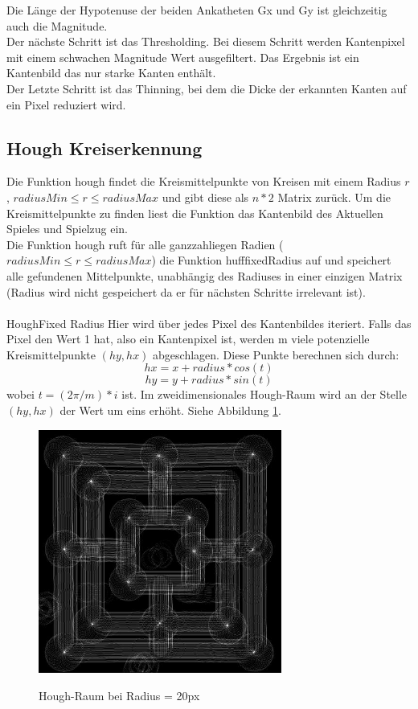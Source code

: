 \documentclass[paper=A4, deutsch]{scrartcl}
\begin{document}
Die Länge der Hypotenuse der beiden Ankatheten Gx und Gy ist gleichzeitig auch die Magnitude.\\
Der nächste Schritt ist das Thresholding. Bei diesem Schritt werden Kantenpixel mit einem schwachen Magnitude Wert ausgefiltert. Das Ergebnis ist ein Kantenbild das nur starke Kanten enthält.\\
Der Letzte Schritt ist das Thinning, bei dem die Dicke der erkannten Kanten auf ein Pixel reduziert wird.\\

\subsection{Hough Kreiserkennung}
Die Funktion hough findet die Kreismittelpunkte von Kreisen mit einem Radius \(r\), \(radiusMin \leq r \leq radiusMax \)  und gibt diese als \(n * 2\) Matrix zurück. 
Um die Kreismittelpunkte zu finden liest die Funktion das Kantenbild des Aktuellen Spieles und Spielzug ein. \\
Die Funktion hough ruft für alle ganzzahliegen Radien (\(radiusMin \leq r \leq radiusMax\)) die Funktion hufffixedRadius auf und speichert alle gefundenen Mittelpunkte, unabhängig des Radiuses in einer einzigen Matrix (Radius wird nicht gespeichert da er für nächsten Schritte irrelevant ist).\\
\\

HoughFixed Radius
Hier wird über jedes Pixel des Kantenbildes iteriert. Falls das Pixel den Wert 1 hat, also ein Kantenpixel ist, werden m  viele potenzielle Kreismittelpunkte \((hy, hx)\)  abgeschlagen. Diese Punkte berechnen sich durch:  
\begin{equation}
hx = x + radius * cos(t)
\end{equation}
\begin{equation}
hy = y + radius *  sin(t)
\end{equation}
wobei \(t = (2\pi/m)*i\) ist. 
Im zweidimensionales Hough-Raum wird an der Stelle \((hy, hx)\) der Wert um eins erhöht. Siehe Abbildung \ref{fig:houghfixed}.\\

\begin{figure}[ht]
	\centering
		\includegraphics[width=8cm]{Huffexample3_16.jpg}\\
	\caption[Hough-Raum bei Radius = 20px]{Hough-Raum bei Radius = 20px}
	\label{fig:houghfixed}
\end{figure}
\end{document}
